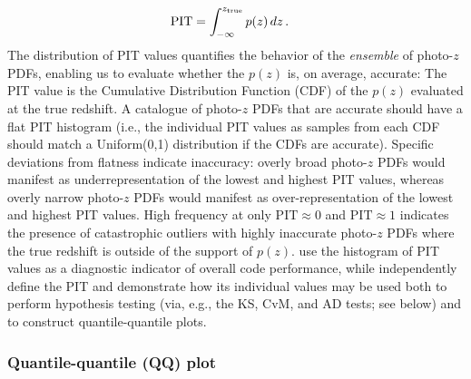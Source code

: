 \begin{align}
\label{eq:pit}
\mathrm{PIT} &= \int_{-\infty}^{z_{\rm true}}p(z)\, dz \,.
\end{align}
The distribution of PIT values quantifies the behavior of the {\it ensemble} of photo-$z$ PDFs, enabling us to evaluate whether the $p(z)$ is, on average, accurate:  The PIT value is the Cumulative Distribution Function (CDF) of the $p(z)$ evaluated at the true redshift.  A catalogue of photo-$z$ PDFs that are accurate should have a flat PIT histogram (i.e., the individual PIT values as samples from each CDF should match a Uniform(0,1) distribution if the CDFs are accurate).  Specific deviations from flatness indicate inaccuracy: overly broad photo-$z$ PDFs would manifest as underrepresentation of the lowest and highest PIT values, whereas overly narrow photo-$z$ PDFs would manifest as over-representation of the lowest and highest PIT values.
High frequency at only $\mathrm{PIT}\approx0$ and $\mathrm{PIT}\approx1$ indicates the presence of catastrophic outliers with highly inaccurate photo-$z$ PDFs where the true redshift is outside of the support of $p(z)$.
\citet{Tanaka:17} use the histogram of PIT values as a diagnostic indicator of overall code performance, while \citet{Freeman:17} independently define the PIT and demonstrate how its individual values may be used both to perform hypothesis testing (via, e.g., the KS, CvM, and AD tests; see below) and to construct quantile-quantile plots.

\subsubsection{Quantile-quantile (QQ) plot}
\label{sec:qq}

